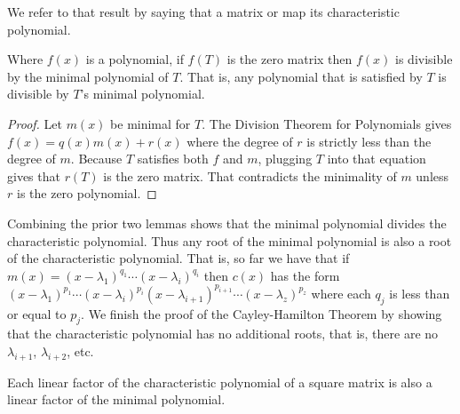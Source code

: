 We refer to that result by saying that a
matrix or map 
its characteristic polynomial.

\begin{lemma} \label{le:tSatisImpMinPolyDivides}
Where \( f(x) \) is a polynomial, if \( f(T) \) is the zero matrix 
then \( f(x) \) is divisible by the minimal polynomial of \( T \).
That is, any polynomial that is satisfied by \( T \) is divisible by
\( T \)'s minimal polynomial.
\end{lemma}

\begin{proof}
Let \( m(x) \) be minimal for \( T \).
The Division Theorem for Polynomials gives
\( f(x)=q(x)m(x)+r(x) \)
where the degree of \( r \) is strictly less than the degree of \( m \).
Because $T$ satisfies both $f$ and $m$, plugging $T$ into that equation gives
that \( r(T) \) is the zero matrix.
That contradicts the minimality of \( m \) unless \( r \)
is the zero polynomial.
\end{proof}

Combining the prior two lemmas shows that the minimal polynomial 
divides the characteristic polynomial. 
Thus
any root of the minimal polynomial is also a root of the characteristic
polynomial. 
That is, so far we have that if 
\( m(x)=(x-\lambda_1)^{q_1}\cdots(x-\lambda_i)^{q_i} \) then
\( c(x) \) has the form
\( (x-\lambda_1)^{p_1}\cdots(x-\lambda_i)^{p_i}
     (x-\lambda_{i+1})^{p_{i+1}}\cdots(x-\lambda_z)^{p_z} \) where
each \( q_j \) is less than or equal to \( p_j \).
We finish the proof of the Cayley-Hamilton Theorem by showing that 
the characteristic polynomial has no additional roots, that is,
there are no $\lambda_{i+1}$, $\lambda_{i+2}$, etc.

\begin{lemma}
Each linear factor of the characteristic polynomial of a square matrix
is also a linear factor of the minimal polynomial.
\end{lemma}

